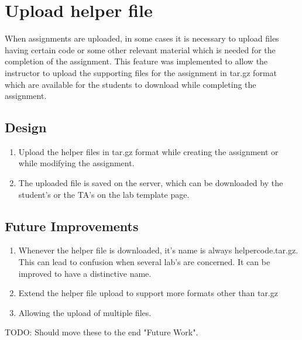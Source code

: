 \section{Upload helper file}
When assignments are uploaded, in some cases it is necessary to upload files having certain code or some other relevant material which is needed for the completion of the assignment. This feature was implemented to allow the instructor to upload the supporting files for the assignment in tar.gz format which are available for the students to download while completing the assignment.

\subsection{Design}
\begin{enumerate}
\item Upload the helper files in tar.gz format while creating the assignment or while modifying the assignment.
\item The uploaded file is saved on the server, which can be downloaded by the student's or the TA's on the lab template page.
\end{enumerate}

\subsection{Future Improvements}
\begin{enumerate}
\item Whenever the helper file is downloaded, it's name is always helpercode.tar.gz. This can lead to confusion when several lab's are concerned. It can be improved to have a distinctive name.
\item Extend the helper file upload to support more formats other than tar.gz
\item Allowing the upload of multiple files.
\end{enumerate}

TODO: Should move these to the end "Future Work".